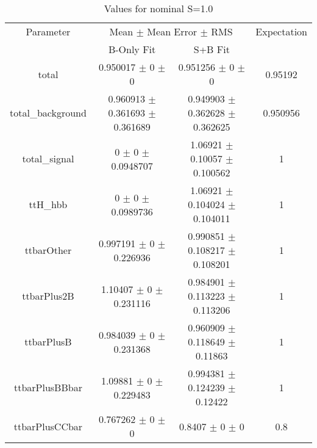 \begin{table}
\centering
\caption{Values for nominal S=1.0}
\begin{tabular}{cccc}
\toprule
Parameter & \multicolumn{2}{c}{Mean $\pm$ Mean Error $\pm$ RMS} & Expectation\\
 & B-Only Fit & S+B Fit & \\
\midrule
total & \num{0.950017} $\pm$ \num{0} $\pm$ \num{0} & \num{0.951256} $\pm$ \num{0} $\pm$ \num{0} & \num{0.95192}\\
total\_background & \num{0.960913} $\pm$ \num{0.361693} $\pm$ \num{0.361689} & \num{0.949903} $\pm$ \num{0.362628} $\pm$ \num{0.362625} & \num{0.950956}\\
total\_signal & \num{0} $\pm$ \num{0} $\pm$ \num{0.0948707} & \num{1.06921} $\pm$ \num{0.10057} $\pm$ \num{0.100562} & \num{1}\\
ttH\_hbb & \num{0} $\pm$ \num{0} $\pm$ \num{0.0989736} & \num{1.06921} $\pm$ \num{0.104024} $\pm$ \num{0.104011} & \num{1}\\
ttbarOther & \num{0.997191} $\pm$ \num{0} $\pm$ \num{0.226936} & \num{0.990851} $\pm$ \num{0.108217} $\pm$ \num{0.108201} & \num{1}\\
ttbarPlus2B & \num{1.10407} $\pm$ \num{0} $\pm$ \num{0.231116} & \num{0.984901} $\pm$ \num{0.113223} $\pm$ \num{0.113206} & \num{1}\\
ttbarPlusB & \num{0.984039} $\pm$ \num{0} $\pm$ \num{0.231368} & \num{0.960909} $\pm$ \num{0.118649} $\pm$ \num{0.11863} & \num{1}\\
ttbarPlusBBbar & \num{1.09881} $\pm$ \num{0} $\pm$ \num{0.229483} & \num{0.994381} $\pm$ \num{0.124239} $\pm$ \num{0.12422} & \num{1}\\
ttbarPlusCCbar & \num{0.767262} $\pm$ \num{0} $\pm$ \num{0} & \num{0.8407} $\pm$ \num{0} $\pm$ \num{0} & \num{0.8}\\
\bottomrule
\end{tabular}
\end{table}